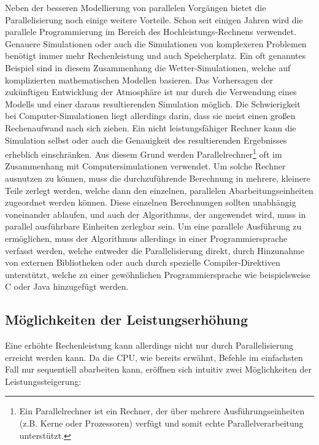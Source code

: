 		Neben der besseren Modellierung von parallelen Vorgängen bietet die Parallelisierung noch einige weitere Vorteile. Schon seit einigen Jahren wird die parallele Programmierung im Bereich des Hochleistungs-Rechnens verwendet. Genauere Simulationen oder auch die Simulationen von komplexeren Problemen benötigt immer mehr Rechenleistung und auch Speicherplatz. Ein oft genanntes Beispiel sind in diesem Zusammenhang die Wetter-Simulationen, welche auf komplizierten mathematischen Modellen basieren. Das Vorhersagen der zukünftigen Entwicklung der Atmosphäre ist nur durch die Verwendung eines Modells und einer daraus resultierenden Simulation möglich.
		Die Schwierigkeit bei Computer-Simulationen liegt allerdings darin, dass sie meist einen großen Rechenaufwand nach sich ziehen. Ein nicht leistungsfähiger Rechner kann die Simulation selbst oder auch die Genauigkeit des resultierenden Ergebnisses erheblich einschränken. Aus diesem Grund werden Parallelrechner\footnote{Ein Parallelrechner ist ein Rechner, der über mehrere Ausführungseinheiten (z.B. Kerne oder Prozessoren) verfügt und somit echte Parallelverarbeitung unterstützt.} oft im Zusammenhang mit Computersimulationen verwendet. Um solche Rechner ausnutzen zu können, muss die durchzuführende Berechnung in mehrere, kleinere Teile zerlegt werden, welche dann den einzelnen, parallelen Abarbeitungseinheiten zugeordnet werden können. Diese einzelnen Berechnungen sollten unabhängig voneinander ablaufen, und auch der Algorithmus, der angewendet wird, muss in parallel ausführbare Einheiten zerlegbar sein. Um eine parallele Ausführung zu ermöglichen, muss der Algorithmus allerdings in einer Programmiersprache verfasst werden, welche entweder die Parallelisierung direkt, durch Hinzunahme von externen Bibliotheken oder auch durch spezielle Compiler-Direktiven unterstützt, welche zu einer gewöhnlichen Programmiersprache wie beispielsweise C oder Java hinzugefügt werden. \cite{ParaProgRauber}\\
		
		\subsection{Möglichkeiten der Leistungserhöhung}
			\label{MoeglichkeitenLeistungserhoehung}
		
			Eine erhöhte Rechenleistung kann allerdings nicht nur durch Parallelisierung erreicht werden kann. Da die CPU, wie bereits erwähnt, Befehle im einfachsten Fall nur sequentiell abarbeiten kann, eröffnen sich intuitiv zwei Möglichkeiten der Leistungssteigerung:
		
